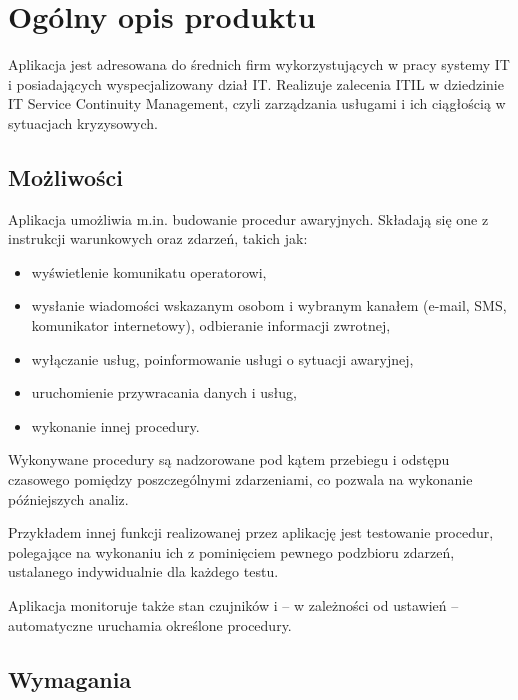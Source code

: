 \documentclass[a4paper,12pt]{article}
\begin{document}

\section{Ogólny opis produktu}

Aplikacja jest adresowana do średnich firm wykorzystujących w pracy systemy IT i posiadających
wyspecjalizowany dział IT. Realizuje zalecenia ITIL w dziedzinie IT Service Continuity Management,
czyli zarządzania usługami i ich ciągłością w sytuacjach kryzysowych.

\subsection{Możliwości}

Aplikacja umożliwia m.in. budowanie procedur awaryjnych. Składają się one z instrukcji warunkowych oraz zdarzeń, takich jak:

\begin{itemize}

	\item wyświetlenie komunikatu operatorowi,

	\item wysłanie wiadomości wskazanym osobom i wybranym kanałem (e-mail, SMS, komunikator internetowy),
	odbieranie informacji zwrotnej,

	\item wyłączanie usług, poinformowanie usługi o sytuacji awaryjnej,

	\item uruchomienie przywracania danych i usług,

	\item wykonanie innej procedury.

\end{itemize}

Wykonywane procedury są nadzorowane pod kątem przebiegu i odstępu czasowego pomiędzy
poszczególnymi zdarzeniami, co pozwala na wykonanie późniejszych analiz.

Przykładem innej funkcji realizowanej przez aplikację jest testowanie procedur, polegające
na wykonaniu ich z pominięciem pewnego podzbioru zdarzeń, ustalanego indywidualnie dla każdego testu.

Aplikacja monitoruje także stan czujników i -- w zależności od ustawień -- automatyczne
uruchamia określone procedury.

\subsection{Wymagania}
\end{document}
